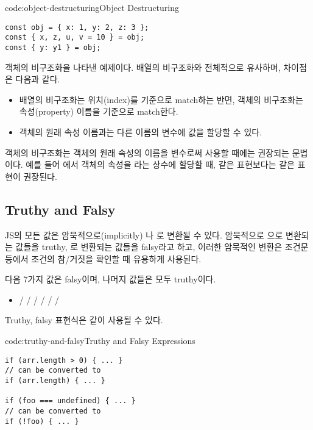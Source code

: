 \begin{codeenv}{code:object-destructuring}{Object Destructuring}\begin{verbatim}
const obj = { x: 1, y: 2, z: 3 };
const { x, z, u, v = 10 } = obj;
const { y: y1 } = obj;
\end{verbatim}
\end{codeenv}

\은 객체의 비구조화을 나타낸 예제이다. 배열의 비구조화와 전체적으로 유사하며, 차이점은 다음과 같다.

\begin{itemize}
    \item 배열의 비구조화는 위치(index)를 기준으로 match하는 반면, 객체의 비구조화는 속성(property) 이름을 기준으로 match한다.
    \item 객체의 원래 속성 이름과는 다른 이름의 변수에 값을 할당할 수 있다.
\end{itemize}

객체의 비구조화는 객체의 원래 속성의 이름을 변수로써 사용할 때에는 권장되는 문법이다. 예를 들어 에서  객체의  속성을 라는 상수에 할당할 때,  같은 표현보다는  같은 표현이 권장된다.
\newpage

\subsection*{Truthy and Falsy}

JS의 모든 값은 암묵적으로(implicitly) 나 로 변환될 수 있다. 암묵적으로 으로 변환되는 값들을 truthy, 로 변환되는 값들을 falsy라고 하고, 이러한 암묵적인 변환은 조건문 등에서 조건의 참/거짓을 확인할 때 유용하게 사용된다.

다음 7가지 값은 falsy이며, 나머지 값들은 모두 truthy이다.

\begin{itemize}
    \item {} /  /  /  /  /  / 
\end{itemize}

Truthy, falsy 표현식은 \와 같이 사용될 수 있다.

\begin{codeenv}{code:truthy-and-falsy}{Truthy and Falsy Expressions}\begin{verbatim}
if (arr.length > 0) { ... }
// can be converted to
if (arr.length) { ... }

if (foo === undefined) { ... }
// can be converted to
if (!foo) { ... }
\end{verbatim}
\end{codeenv}

